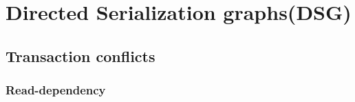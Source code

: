 \documentclass[a4paper,10pt,titlepage]{report}
\begin{document}




    
    
    
        \section{Directed Serialization graphs(DSG)}
    
    
    \subsection{Transaction conflicts}
    
    \subsubsection{Read-dependency}
\end{document}
